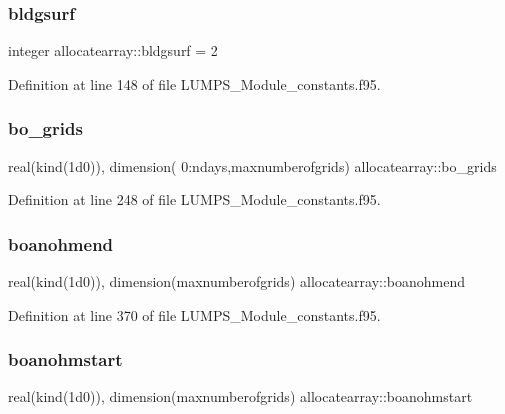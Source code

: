 \subsubsection{\texorpdfstring{bldgsurf}{bldgsurf}}
{\footnotesize\ttfamily integer allocatearray\+::bldgsurf = 2}



Definition at line 148 of file L\+U\+M\+P\+S\+\_\+\+Module\+\_\+constants.\+f95.

\mbox{\label{namespaceallocatearray_ace47843655c90683e7e9d552fe6d16df}} 
\subsubsection{\texorpdfstring{bo\+\_\+grids}{bo\_grids}}
{\footnotesize\ttfamily real(kind(1d0)), dimension( 0\+:ndays,maxnumberofgrids) allocatearray\+::bo\+\_\+grids}



Definition at line 248 of file L\+U\+M\+P\+S\+\_\+\+Module\+\_\+constants.\+f95.

\mbox{\label{namespaceallocatearray_a69fef98bd89eb5bb96f19caf0e300cb2}} 
\subsubsection{\texorpdfstring{boanohmend}{boanohmend}}
{\footnotesize\ttfamily real(kind(1d0)), dimension(maxnumberofgrids) allocatearray\+::boanohmend}



Definition at line 370 of file L\+U\+M\+P\+S\+\_\+\+Module\+\_\+constants.\+f95.

\mbox{\label{namespaceallocatearray_a2f2000b6fe2d48ee6df98331bd186501}} 
\subsubsection{\texorpdfstring{boanohmstart}{boanohmstart}}
{\footnotesize\ttfamily real(kind(1d0)), dimension(maxnumberofgrids) allocatearray\+::boanohmstart}



